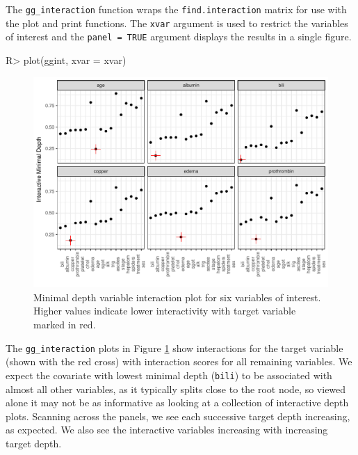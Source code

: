 \documentclass[article]{jss}
\begin{document}
The \texttt{gg\_interaction} function wraps the
\texttt{find.interaction} matrix for use with the 
plot and print functions. The \texttt{xvar} argument is used to restrict
the variables of interest and the \texttt{panel\ =\ TRUE} argument
displays the results in a single figure.

\begin{Schunk}
\begin{Sinput}
R> plot(ggint, xvar = xvar)
\end{Sinput}
\begin{figure}[!htb]

{\centering \includegraphics{fig-rfs/rfs-interactionPanel-1} 

}

\caption[Minimal depth variable interaction plot for six variables of interest]{Minimal depth variable interaction plot for six variables of interest. Higher values indicate lower interactivity with target variable marked in red.}\label{fig:interactionPanel}
\end{figure}
\end{Schunk}

The \texttt{gg\_interaction} plots in Figure \ref{fig:interactionPanel}
show interactions for the target variable (shown with the red cross)
with interaction scores for all remaining variables. We expect the
covariate with lowest minimal depth (\texttt{bili}) to be associated
with almost all other variables, as it typically splits close to the
root node, so viewed alone it may not be as informative as looking at a
collection of interactive depth plots. Scanning across the panels, we
see each successive target depth increasing, as expected. We also see
the interactive variables increasing with increasing target depth.
\end{document}
